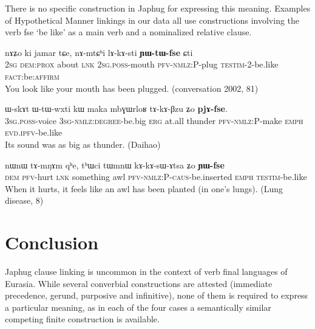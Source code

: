 \documentclass[oldfontcommands,oneside,a4paper,11pt]{article}
\newcommand{\ipa}[1]{{\phon \mbox{#1}}} %
\begin{document}
There is no specific construction in Japhug for expressing this meaning. Examples of Hypothetical Manner linkings in our data all use constructions involving the verb \ipa{fse} `be like' as a main verb and a nominalized relative clause.

\begin{exe}
\ex \label{ex:lAkAsti.YWtWfse}
\gll
\ipa{nɤʑo}         	\ipa{ki}         	\ipa{jamar}         	\ipa{tɕe,}         	\ipa{nɤ-mtɕʰi}         	\ipa{lɤ-kɤ-sti}         	\ipa{\textbf{ɲɯ-tɯ-fse}}         	\ipa{ɕti}     \\    
\textsc{2sg} \textsc{dem:prox} about \textsc{lnk} \textsc{2sg.poss}-mouth \textsc{pfv-nmlz:P}-plug \textsc{testim}-2-be.like \textsc{fact}:be:\textsc{affirm} \\
\glt You look like your mouth has been plugged. (conversation 2002, 81)
\end{exe}


\begin{exe}
\ex \label{ex:mbGWrloR.tAkABzu}
\gll
      	\ipa{ɯ-skɤt}         	\ipa{ɯ-tɯ-wxti}         	\ipa{kɯ}         	\ipa{maka}         	\ipa{mbɣɯrloʁ}         	\ipa{tɤ-kɤ-βzu}         	\ipa{ʑo}         	\ipa{\textbf{pjɤ-fse}.}         \\
  \textsc{3sg.poss}-voice \textsc{3sg-nmlz:degree}-be.big \textsc{erg} at.all thunder \textsc{pfv-nmlz:P}-make \textsc{emph} \textsc{evd.ipfv}-be.like \\
\glt Its sound was as big as thunder.  (Daihao)
\end{exe}
\begin{exe}
\ex \label{ex:tWmnW.tAkAsAtsa}
\gll
\ipa{nɯnɯ}         	\ipa{tɤ-mŋɤm}         	\ipa{qʰe,}         	\ipa{tʰɯci}         	\ipa{tɯmnɯ}         	\ipa{kɤ-kɤ-sɯ-ɤtsa}         	\ipa{ʑo}         	\ipa{\textbf{ɲɯ-fse}}         \\
\textsc{dem} \textsc{pfv}-hurt \textsc{lnk} something awl \textsc{pfv-nmlz:P-caus}-be.inserted  \textsc{emph} \textsc{testim}-be.like \\
\glt  When it hurts, it feels like an awl has been planted (in one's lungs).  (Lung disease, 8)
\end{exe}
 


\section{Conclusion}
Japhug clause linking is uncommon in the context of verb final languages of Eurasia. While  several converbial constructions are attested (immediate precedence, gerund, purposive and infinitive), none of them is required to express a particular meaning, as in each of the four cases a semantically similar competing finite construction is available.
\end{document}
